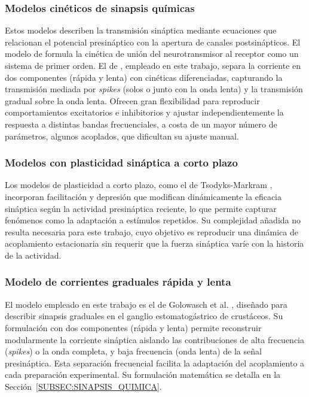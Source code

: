 \subsubsection{Modelos cinéticos de sinapsis químicas}

Estos modelos describen la transmisión sináptica mediante ecuaciones que relacionan el potencial presináptico con la apertura de canales postsinápticos. El modelo de \cite{Destexhe1994} formula la cinética de unión del neurotransmisor al receptor como un sistema de primer orden. El de \cite{Golowasch1999}, empleado en este trabajo, separa la corriente en dos componentes (rápida y lenta) con cinéticas diferenciadas, capturando la transmisión mediada por \textit{spikes} (solos o junto con la onda lenta) y la transmisión gradual sobre la onda lenta. Ofrecen gran flexibilidad para reproducir comportamientos excitatorios e inhibitorios y ajustar independientemente la respuesta a distintas bandas frecuenciales, a costa de un mayor número de parámetros, algunos acoplados, que dificultan su ajuste manual.

\subsubsection{Modelos con plasticidad sináptica a corto plazo}

Los modelos de plasticidad a corto plazo, como el de Tsodyks-Markram \cite{TsodyksMarkram1998}, incorporan facilitación y depresión que modifican dinámicamente la eficacia sináptica según la actividad presináptica reciente, lo que permite capturar fenómenos como la adaptación a estímulos repetidos. Su complejidad añadida no resulta necesaria para este trabajo, cuyo objetivo es reproducir una dinámica de acoplamiento estacionaria sin requerir que la fuerza sináptica varíe con la historia de la actividad.

\subsubsection{Modelo de corrientes graduales rápida y lenta}

El modelo empleado en este trabajo es el de Golowasch et al. \cite{Golowasch1999}, diseñado para describir sinapsis graduales en el ganglio estomatogástrico de crustáceos. Su formulación con dos componentes (rápida y lenta) permite reconstruir modularmente la corriente sináptica aislando las contribuciones de alta frecuencia (\textit{spikes}) o la onda completa, y baja frecuencia  (onda lenta) de la señal presináptica. Esta separación frecuencial facilita la adaptación del acoplamiento a cada preparación experimental. Su formulación matemática se detalla en la Sección~\ref{SUBSEC:SINAPSIS_QUIMICA}.

